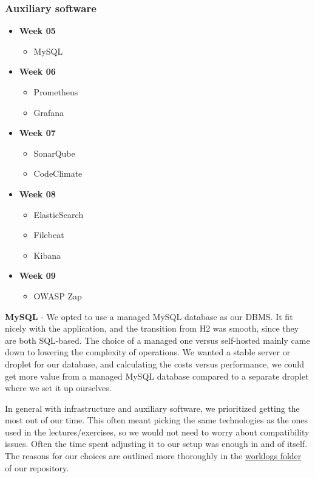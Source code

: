\subsubsection*{Auxiliary software}
\begin{itemize}
    \item \textbf{Week 05}
        \begin{itemize}
            \item MySQL
        \end{itemize}
    \item \textbf{Week 06}
        \begin{itemize}
            \item Prometheus
            \item Grafana
        \end{itemize}
            \item \textbf{Week 07}
        \begin{itemize}
            \item SonarQube
            \item CodeClimate
        \end{itemize}
        \item \textbf{Week 08}
        \begin{itemize}
            \item ElasticSearch
            \item Filebeat
            \item Kibana
        \end{itemize}
        \item \textbf{Week 09}
        \begin{itemize}
            \item OWASP Zap
        \end{itemize}
\end{itemize}
\textbf{MySQL} - We opted to use a managed MySQL database as our DBMS. It fit nicely with the application, and the transition from H2 was smooth, since they are both SQL-based. The choice of a managed one versus self-hosted mainly came down to lowering the complexity of operations. We wanted a stable server or droplet for our database, and calculating the costs versus performance, we could get more value from a managed MySQL database compared to a separate droplet where we set it up ourselves. 

In general with infrastructure and auxiliary software, we prioritized getting the most out of our time. This often meant picking the same technologies as the ones used in the lectures/exercises, so we would not need to worry about compatibility issues. Often the time spent adjusting it to our setup was enough in and of itself. The reasons for our choices are outlined more thoroughly in the \href{https://github.com/Academic-Weapons/ITU2023-DevOps/tree/dev/worklogs}{worklogs folder} of our repository.


